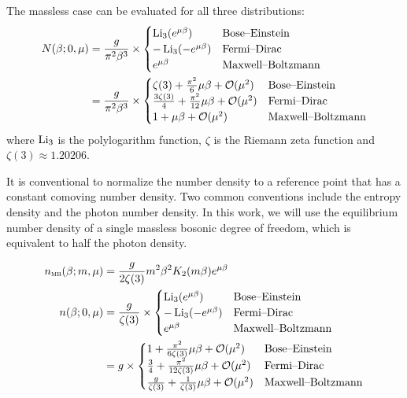 \documentclass[
  a4paper,             %
  11pt,                %
  oneside,             %
  onecolumn,           %
  bibliography=totoc,  %
  final,               %
]{scrartcl}
\begin{document}
The massless case can be evaluated for all three distributions:
\begin{subequations}
  \begin{align}
    N(\beta; 0, \mu) &= \frac{g}{\pi^2 \beta^3} \times \begin{cases}
       \operatorname{Li}_3(e^{\mu \beta}) & \text{Bose--Einstein} \\
       - \operatorname{Li}_3(- e^{\mu \beta}) & \text{Fermi--Dirac} \\
       e^{\mu \beta} & \text{Maxwell--Boltzmann}
    \end{cases} \\
    &= \frac{g}{\pi^2 \beta^3} \times \begin{cases}
       \zeta(3) + \frac{\pi^2}{6} \mu \beta + \mathcal{O}(\mu^2) & \text{Bose--Einstein} \\
       \frac{3 \zeta(3)}{4} + \frac{\pi^2}{12} \mu \beta + \mathcal{O}(\mu^2) & \text{Fermi--Dirac} \\
       1 + \mu \beta + \mathcal{O}(\mu^2) & \text{Maxwell--Boltzmann}
    \end{cases}
  \end{align}
\end{subequations}
where \(\operatorname{Li}_3\) is the polylogarithm function, \(\zeta\) is the Riemann zeta
function and \(\zeta(3) \approx 1.20206\).

It is conventional to normalize the number density to a reference point that has
a constant comoving number density.  Two common conventions include the entropy
density and the photon number density.  In this work, we will use the
equilibrium number density of a single massless bosonic degree of freedom, which
is equivalent to half the photon density.

\begin{subequations}
  \begin{align}
    n_{\textsc{mb}}(\beta; m, \mu) &= \frac{g}{2 \zeta(3)} m^2 \beta^2 K_2(m \beta) e^{\mu \beta} \\
    n(\beta; 0, \mu) &= \frac{g}{\zeta(3)} \times \begin{cases}
       \operatorname{Li}_3(e^{\mu \beta}) & \text{Bose--Einstein} \\
       - \operatorname{Li}_3(- e^{\mu \beta}) & \text{Fermi--Dirac} \\
       e^{\mu \beta} & \text{Maxwell--Boltzmann}
    \end{cases} \\
    &= g \times \begin{cases}
       1 + \frac{\pi^2}{6 \zeta(3)} \mu \beta + \mathcal{O}(\mu^2) & \text{Bose--Einstein} \\
       \frac{3}{4} + \frac{\pi^2}{12 \zeta(3)} \mu \beta + \mathcal{O}(\mu^2) & \text{Fermi--Dirac} \\
       \frac{g}{\zeta(3)} + \frac{1}{\zeta(3)} \mu \beta + \mathcal{O}(\mu^2) & \text{Maxwell--Boltzmann}
    \end{cases}
  \end{align}
\end{subequations}
\end{document}
